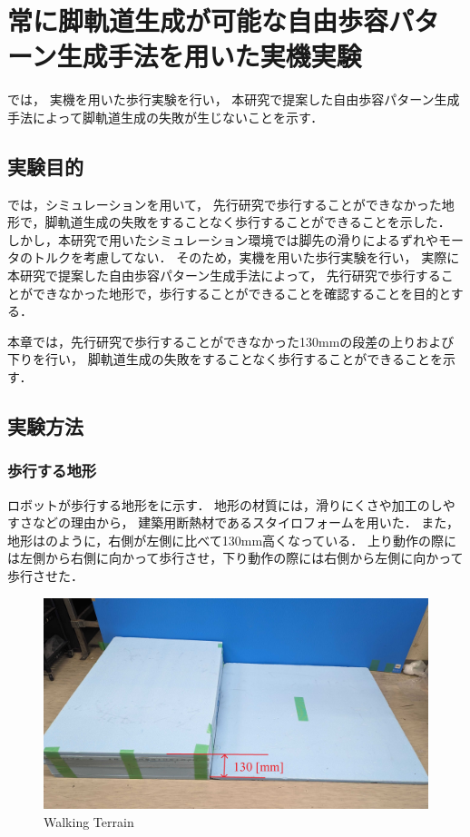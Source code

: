 ﻿
\chapter{常に脚軌道生成が可能な自由歩容パターン生成手法を用いた実機実験}\label{chapter:常に脚軌道生成が可能な自由歩容パターン生成手法を用いた実機実験}

では，
実機を用いた歩行実験を行い，
本研究で提案した自由歩容パターン生成手法によって脚軌道生成の失敗が生じないことを示す．

\section{実験目的}
では，シミュレーションを用いて，
先行研究で歩行することができなかった地形で，脚軌道生成の失敗をすることなく歩行することができることを示した．
しかし，本研究で用いたシミュレーション環境では脚先の滑りによるずれやモータのトルクを考慮してない．
そのため，実機を用いた歩行実験を行い，
実際に本研究で提案した自由歩容パターン生成手法によって，
先行研究で歩行することができなかった地形で，歩行することができることを確認することを目的とする．

本章では，先行研究で歩行することができなかった130mmの段差の上りおよび下りを行い，
脚軌道生成の失敗をすることなく歩行することができることを示す．

\section{実験方法}
\subsection{歩行する地形}
ロボットが歩行する地形をに示す．
地形の材質には，滑りにくさや加工のしやすさなどの理由から，
建築用断熱材であるスタイロフォームを用いた．
また，地形はのように，右側が左側に比べて130mm高くなっている．
上り動作の際には左側から右側に向かって歩行させ，下り動作の際には右側から左側に向かって歩行させた．

\begin{figure}[tb]
  \centering
  \includegraphics[width=0.8\linewidth]{figure/chapter5/walking-terrain.jpg}
  \caption{Walking Terrain}
  \label{fig:walking-terrain}  %
\end{figure}

